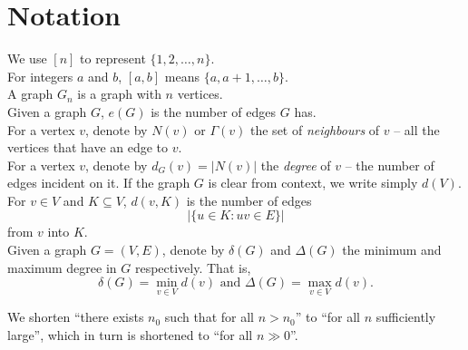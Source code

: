 \section{Notation}
	
	We use $[n]$ to represent $\{1,2,\ldots,n\}$.\\
	For integers $a$ and $b$, $[a,b]$ means $\{a,a+1,\ldots,b\}$.\\
	A graph $G_n$ is a graph with $n$ vertices.\\
	Given a graph $G$, $e(G)$ is the number of edges $G$ has.\\
	For a vertex $v$, denote by $N(v)$ or $\Gamma(v)$ the set of \emph{neighbours} of $v$ -- all the vertices that have an edge to $v$.\\
	For a vertex $v$, denote by $d_G(v) = |N(v)|$ the \emph{degree} of $v$ -- the number of edges incident on it. If the graph $G$ is clear from context, we write simply $d(V)$. \\
	For $v \in V$ and $K \subseteq V$, $d(v,K)$ is the number of edges
	\[ \left|\{ u \in K : uv \in E \}\right| \]
	from $v$ into $K$.\\
	Given a graph $G = (V,E)$, denote by $\delta(G)$ and $\Delta(G)$ the minimum and maximum degree in $G$ respectively. That is,
	\[ \delta(G) = \min_{v \in V} d(v) \text{ and } \Delta(G) = \max_{v \in V} d(v). \]

	We shorten ``there exists $n_0$ such that for all $n > n_0$'' to ``for all $n$ sufficiently large'', which in turn is shortened to ``for all $n\gg 0$''.

\clearpage